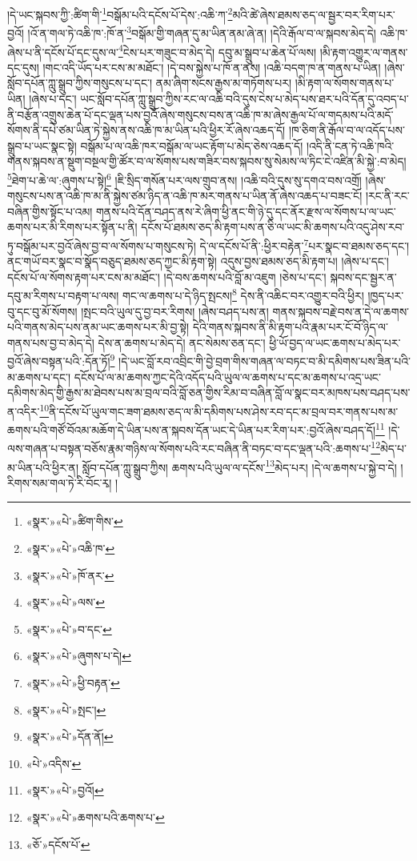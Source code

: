 །དེ་ཡང་སྐབས་ཀྱི་:ཚིག་གི་\footnote{«སྣར་»«པེ་»ཚིག་གིས་}བསྒོམ་པའི་དངོས་པོ་དེས་:འཆི་ཀ་\footnote{«སྣར་»«པེ་»འཆི་ཁ་}མའི་ཚེ་ཞེས་ཐམས་ཅད་ལ་སྦྱར་བར་རིག་པར་བྱའོ། །འོ་ན་གལ་ཏེ་འཆི་ཁ་:ཁོ་ན་\footnote{«སྣར་»«པེ་»ཁོ་ནར་}བསྒོམ་གྱི་གཞན་དུ་མ་ཡིན་ནམ་ཞེ་ན། །དེའི་རྒོལ་བ་ལ་སྐབས་མེད་དེ། འཆི་ཁ་ཞེས་པ་ནི་དངོས་པོ་དང་དུས་ལ་\footnote{«སྣར་»«པེ་»ལས་}ངེས་པར་གཟུང་བ་མེད་དེ། དབུ་མ་སྒྲུབ་པ་ཆེན་པོ་ལས། །མི་རྟག་འགྱུར་ལ་གནས་དང་དུས། །གང་འདི་ཡོད་པར་ངས་མ་མཐོང་། །དེ་བས་སྐྱེས་པ་ཁོ་ན་ནས། །འཆི་བདག་ཁ་ན་གནས་པ་ཡིན། །ཞེས་སློབ་དཔོན་ཀླུ་སྒྲུབ་ཀྱིས་གསུངས་པ་དང་། ནམ་ཞིག་སངས་རྒྱས་མ་གཏོགས་པར། །མི་རྟག་ལ་སོགས་གནས་པ་ཡིན། །ཞེས་པ་དང་། ཡང་སློབ་དཔོན་ཀླུ་སྒྲུབ་ཀྱིས་རང་ལ་འཆི་བའི་དུས་ངེས་པ་མེད་པས་ཐར་པའི་དོན་དུ་འབད་པ་ནི་བརྩོན་འགྲུས་ཆེན་པོ་དང་ལྡན་པས་བྱའོ་ཞེས་གསུངས་བས་ན་འཆི་ཁ་མ་ཞེས་རྒྱལ་པོ་ལ་གདམས་པའི་མདོ་སོགས་ནི་དཔེ་ཙམ་ཡིན་ཏེ་སྐྱེས་ནས་འཆི་ཁ་མ་ཡིན་པའི་ཕྱིར་རོ་ཞེས་འཆད་དོ། །ཁ་ཅིག་ནི་རྒོལ་བ་ལ་འདོད་པས་སྒྲུབ་པ་ཡང་སྣང་སྟེ། བསྒོམ་པ་ལ་འཆི་ཁར་བསྒོམ་ལ་ཡང་རྟོག་པ་མེད་ཅེས་འཆད་དོ། །འདི་ནི་ངན་ཏེ་འཆི་ཁའི་གནས་སྐབས་ན་སྡུག་བསྔལ་གྱི་ཚོར་བ་ལ་སོགས་པས་གཟིར་བས་སྐབས་སུ་སེམས་ལ་ཏིང་ངེ་འཛིན་མི་སྐྱེ་:བ་མེད། \footnote{«སྣར་»«པེ་»བ་དང་}ཐེག་པ་ཆེ་ལ་:ཞུགས་པ་སྟེ།\footnote{«སྣར་»«པེ་»ཞུགས་པ་དེ།} །ཇི་སྲིད་གསོན་པར་ལས་གྲུབ་ནས། །འཆི་བའི་དུས་སུ་དགའ་བས་འགྲོ། །ཞེས་གསུངས་པས་ན་འཆི་ཁ་མ་ནི་སྐྱེས་ཙམ་ཉིད་ན་འཆི་ཁ་མར་གནས་པ་ཡིན་ནོ་ཞེས་འཆད་པ་བཟང་ངོ། །རང་ནི་རང་བཞིན་གྱིས་སྟོང་པ་འམ། གནས་པའི་དོན་བཤད་ནས་རེ་ཞིག་ཕྱི་ནང་གི་ཉེ་དུ་དང་ནོར་རྫས་ལ་སོགས་པ་ལ་ཡང་ཆགས་པར་མི་རིགས་པར་སྟོན་པ་ནི། དངོས་པོ་ཐམས་ཅད་མི་རྟག་པས་ན་ཅི་ལ་ཡང་མི་ཆགས་པའི་འདུ་ཤེས་རབ་ཏུ་བསྒོམ་པར་བྱའོ་ཞེས་བྱ་བ་ལ་སོགས་པ་གསུངས་ཏེ། དེ་ལ་དངོས་པོ་ནི་:ཕྱིར་བརྟེན་\footnote{«སྣར་»«པེ་»ཕྱི་བརྟན་}པར་སྣང་བ་ཐམས་ཅད་དང་། ནང་གཡོ་བར་སྣང་བ་སྣོད་བཅུད་ཐམས་ཅད་ཀྱང་མི་རྟག་སྟེ། འདུས་བྱས་ཐམས་ཅད་མི་རྟག་པ། །ཞེས་པ་དང་། དངོས་པོ་ལ་སོགས་རྟག་པར་ངས་མ་མཐོང་། །དེ་བས་ཆགས་པའི་བློ་མ་འཇུག །ཅེས་པ་དང་། སྐབས་དང་སྦྱར་ན་དབུ་མ་རིགས་པ་བརྟག་པ་ལས། གང་ལ་ཆགས་པ་དེ་ཉིད་སྤངས།\footnote{«སྣར་»«པེ་»སྤང་།} དེས་ནི་འཆིང་བར་འགྱུར་བའི་ཕྱིར། །ཁྱད་པར་བུ་དང་བུ་མོ་སོགས། །སྤང་བའི་ཡུལ་དུ་བྱ་བར་རིགས། །ཞེས་བཤད་པས་ན། གནས་སྐབས་བརྗེ་བས་ན་དེ་ལ་ཆགས་པའི་གནས་མེད་པས་ནམ་ཡང་ཆགས་པར་མི་བྱ་སྟེ། དེའི་གནས་སྐབས་ནི་མི་རྟག་པའི་རྣམ་པར་ངོ་བོ་ཉིད་ལ་གནས་པས་བྱ་བ་མེད་དེ། དེས་ན་ཆགས་པ་མེད་དེ། ནང་སེམས་ཅན་དང་། ཕྱི་ཡོ་བྱད་ལ་ཡང་ཆགས་པ་མེད་པར་བྱའོ་ཞེས་བསྟན་པའི་:དོན་ཏོ།\footnote{«སྣར་»«པེ་»དོན་ནོ།} །དེ་ཡང་བློ་རབ་འབྲིང་གི་བྱེ་བྲག་གིས་གཞན་ལ་བཏང་བ་མི་དམིགས་པས་ཟིན་པའི་མ་ཆགས་པ་དང་། དངོས་པོ་ལ་མ་ཆགས་ཀྱང་དེའི་འདོད་པའི་ཡུལ་ལ་ཆགས་པ་དང་མ་ཆགས་པ་འདྲ་ཡང་དམིགས་མེད་གྱི་རྒྱས་མ་ཐེབས་པས་མ་བྲལ་བའི་བློ་ཅན་གྱིས་རིམ་བ་བཞིན་བློ་ལ་སྣང་བར་མཁས་པས་བཤད་པས་ན་འདིར་\footnote{«པེ་»འདིས་}ནི་དངོས་པོ་ཡུལ་གང་ཟག་ཐམས་ཅད་ལ་མི་དམིགས་པས་ཤེས་རབ་དང་མ་བྲལ་བར་གནས་པས་མ་ཆགས་པའི་གཙོ་བོའམ་མཆོག་དེ་ཡིན་པས་ན་སྐབས་དོན་ཡང་དེ་ཡིན་པར་རིག་པར་:བྱའོ་ཞེས་བཤད་དོ།\footnote{«སྣར་»«པེ་»བྱའོ།} །དེ་ལས་གཞན་པ་བསྟན་བཅོས་རྣམ་གཉིས་ལ་སོགས་པའི་རང་བཞིན་ནི་བཏང་བ་དང་ལྡན་པའི་:ཆགས་པ་\footnote{«སྣར་»«པེ་»ཆགས་པའི་ཆགས་པ་}མེད་པ་མ་ཡིན་པའི་ཕྱིར་ན། སློབ་དཔོན་ཀླུ་སྒྲུབ་ཀྱིས། ཆགས་པའི་ཡུལ་ལ་དངོས་\footnote{«ཅོ་»དངོས་པོ་}མེད་པར། །དེ་ལ་ཆགས་པ་སྐྱེ་བ་དེ། །རིགས་སམ་གལ་ཏེ་རི་བོང་རྭ། །
